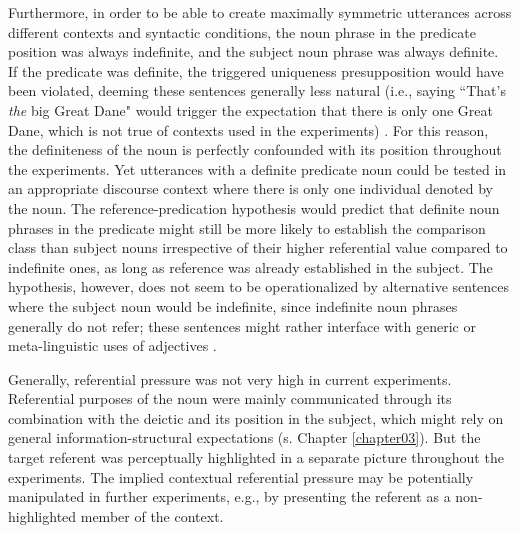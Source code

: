 Furthermore, in order to be able to create maximally symmetric utterances across different contexts and syntactic conditions, the noun phrase in the predicate position was always indefinite, and the subject noun phrase was always definite. If the predicate was definite, the triggered uniqueness presupposition would have been violated, deeming these sentences generally less natural (i.e., saying ``That's \emph{the} big Great Dane" would trigger the expectation that there is only one Great Dane, which is not true of contexts used in the experiments) \parencite[cf.][]{syrett2010meaning}. 
For this reason, the definiteness of the noun is perfectly confounded with its position throughout the experiments. Yet utterances with a definite predicate noun could be tested in an appropriate discourse context where there is only one individual denoted by the noun. The reference-predication hypothesis would predict that definite noun phrases in the predicate might still be more likely to establish the comparison class than subject nouns irrespective of their higher referential value compared to indefinite ones, as long as reference was already established in the subject. 
The hypothesis, however, does not seem to be operationalized by alternative sentences where the subject noun would be indefinite, since indefinite noun phrases generally do not refer; these sentences might rather interface with generic or meta-linguistic uses of adjectives \parencite{Reboul2001, tessler2019language, barker2002dynamics}. 

Generally, referential pressure was not very high in current experiments. Referential purposes of the noun were mainly communicated through its combination with the deictic and its position in the subject, which might rely on general information-structural expectations (s. Chapter \ref{chapter03}). But the target referent was perceptually highlighted in a separate picture throughout the experiments. The implied contextual referential pressure may be potentially manipulated in further experiments, e.g., by presenting the referent as a non-highlighted member of the context. 

